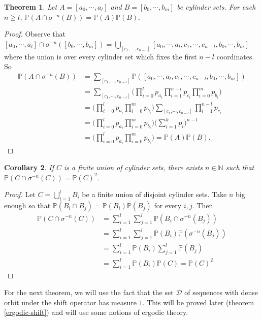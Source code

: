 \documentclass[a4paper]{article}
\theoremstyle{plain}
\newtheorem{theorem}{Theorem}[section] %
\newtheorem{corollary}[theorem]{Corollary}
\theoremstyle{definition}
\newcommand{\PP}{\mathbb{P}}
\begin{document}
\begin{theorem}\label{shift-prop}
    Let $A=[a_0, \cdots, a_l]$ and $B=[b_0, \cdots, b_m]$ be cylinder sets. For each $n\geq l$, $\PP(A\cap\sigma^{-n}(B))=\PP(A)\PP(B).$ 
\end{theorem}
\begin{proof}
    Observe that $[a_0, \cdots, a_l]\cap \sigma^{-n} ([b_0, \cdots, b_m]) = \bigcup_{[c_1, \cdots, c_{n-l}]}[a_0,\cdots, a_l, c_1, \cdots, c_{n-l}, b_0, \cdots, b_m]$ where the union is over every cylinder set which fixes the first $n-l$ coordinates. So 
    \begin{align*}
        \PP(A\cap\sigma^{-n}(B)) &= \sum_{[c_1, \cdots, c_{n-l}]} \PP([a_0,\cdots, a_l, c_1, \cdots, c_{n-l}, b_0, \cdots, b_m])\\
        &= \sum_{[c_1, \cdots, c_{n-l}]} \big(\prod_{i=0}^l p_{a_i}\prod_{i=1}^{n-l}p_{c_i}\prod_{i=0}^m p_{b_i}\big)\\
        &= \big(\prod_{i=0}^l p_{a_i}\prod_{i=0}^mp_{b_i}\big)\sum_{[c_1, \cdots, c_{n-l}]}\prod_{i=1}^{n-l} p_{c_i}\\
        &= \big(\prod_{i=0}^l p_{a_i}\prod_{i=0}^mp_{b_i}\big)\big(\sum_{i=1}^k p_i)^{n-l}\\
        &=\big(\prod_{i=0}^lp_{a_i}\prod_{i=0}^mp_{b_i}\big)=\PP(A)\PP(B).
    \end{align*}
\end{proof}
\begin{corollary}
    If $C$ is a finite union of cylinder sets, there exists $n\in\mathbb N$ such that $\PP(C\cap\sigma^{-n}(C))=\PP(C)^2.$
\end{corollary}
\begin{proof}
    Let $C=\bigcup_{i=1}^l B_i$ be a finite union of disjoint cylinder sets. Take $n$ big enough so that $\PP(B_i\cap B_j)=\PP(B_i)\PP(B_j)$ for every $i, j$. Then 
    \begin{align*}
        \PP(C\cap \sigma^{-n}(C)) &=\sum_{i=1}^l\sum_{j=1}^l \PP(B_i\cap \sigma^{-n}(B_j))\\
        &=\sum_{i=1}^l\sum_{j=1}^l \PP(B_i)\PP(\sigma^{-n}(B_j))\\
        &=\sum_{i=1}^l\PP(B_i)\sum_{j=1}^l \PP(B_j)\\
        &= \sum_{i=1}^l\PP(B_i)\PP(C)=\PP(C)^2
    \end{align*}
    
\end{proof}

For the next theorem, we will use the fact that the set $\mathcal D$ of sequences with dense orbit under the shift operator has measure $1$. This will be proved later (theorem \ref{ergodic-shift}) and will use some notions of ergodic theory.
\end{document}
